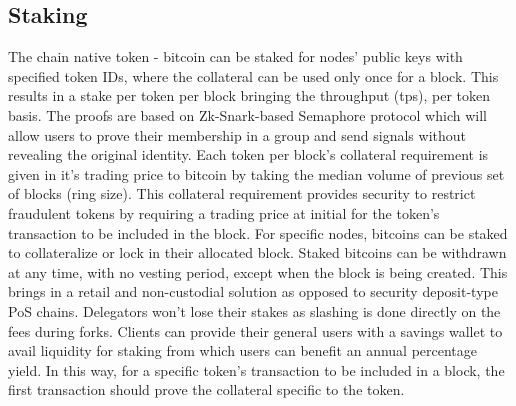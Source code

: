 \documentclass[a4paper,10pt]{article}
\begin{document}
\subsection{Staking}
The chain native token - bitcoin can be staked for nodes' public keys with specified token IDs, where the collateral can be used only once for a block. This results in a stake per token per block bringing the throughput (tps), per token basis. The proofs are based on Zk-Snark-based Semaphore protocol \cite{semaphore} which will allow users to prove their membership in a group and send signals without revealing the original identity. Each token per block's collateral requirement is given in it's trading price to bitcoin by taking the median volume of previous set of blocks (ring size). This collateral requirement provides security to restrict fraudulent tokens by requiring a trading price at initial for the token's transaction to be included in the block. For specific nodes, bitcoins can be staked to collateralize or lock in their allocated block. Staked bitcoins can be withdrawn at any time, with no vesting period, except when the block is being created. This brings in a retail and non-custodial solution as opposed to security deposit-type PoS chains. Delegators won't lose their stakes as slashing is done directly on the fees during forks. Clients can provide their general users with a savings wallet to avail liquidity for staking from which users can benefit an annual percentage yield. In this way, for a specific token's transaction to be included in a block, the first transaction should prove the collateral specific to the token.
\end{document}
